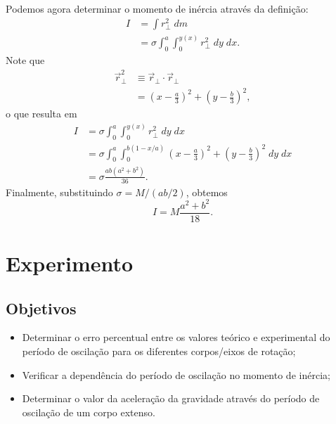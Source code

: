 Podemos agora determinar o momento de inércia através da definição:
\begin{align}
    I &= \int r_{\perp}^2 \;dm \\
    &= \sigma \int_{0}^{a} \int_{0}^{y(x)} r_\perp^2 \; dy\;dx.
\end{align}
%
Note que
\begin{align}
    \vec{r}_\perp^2 &\equiv \vec{r}_\perp \cdot \vec{r}_\perp \\
    &= \left(x - \frac{a}{3}\right)^2 + \left(y - \frac{b}{3}\right)^2,
\end{align}
%
o que resulta em 
\begin{align}
    I &= \sigma \int_{0}^{a} \int_{0}^{y(x)} r_\perp^2 \; dy\;dx \\
    &= \sigma \int_{0}^{a} \int_{0}^{b(1-x/a)} \left(x - \frac{a}{3}\right)^2 + \left(y - \frac{b}{3}\right)^2 \; dy\;dx \\
    &= \sigma \frac{ab(a^2 + b^2)}{36}.
\end{align}
%
Finalmente, substituindo $\sigma = M / (ab/2)$, obtemos
\begin{equation}
    I = M \frac{a^2 + b^2}{18}.
\end{equation}

\section{Experimento}

\subsection{Objetivos}
\label{Sec:ObjetivosPenduloFisico}

\begin{itemize}
	\item Determinar o erro percentual entre os valores teórico e experimental do período de oscilação para os diferentes corpos/eixos de rotação;
	\item Verificar a dependência do período de oscilação no momento de inércia;
	\item Determinar o valor da aceleração da gravidade através do período de oscilação de um corpo extenso.
\end{itemize}

